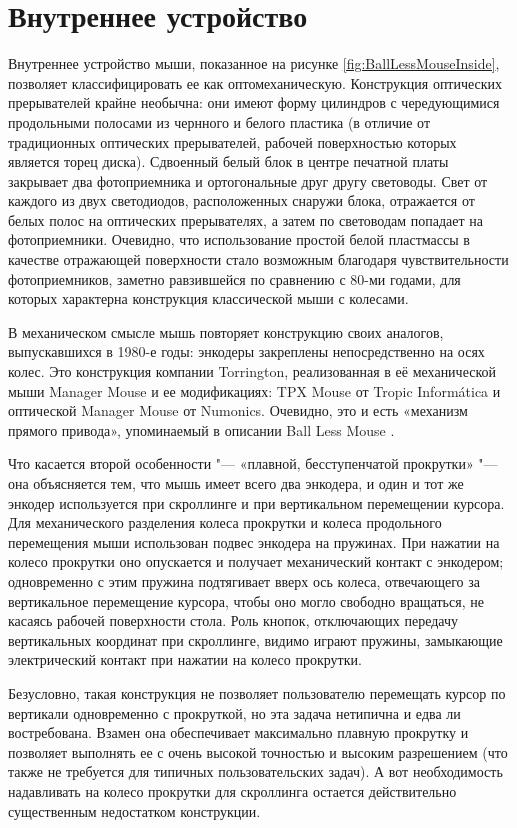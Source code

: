 \documentclass[11pt, a4paper]{article}
\begin{document}
\section*{Внутреннее устройство}

Внутреннее устройство мыши, показанное на рисунке \ref{fig:BallLessMouseInside}, позволяет классифицировать ее как оптомеханическую.
Конструкция оптических прерывателей крайне необычна: они имеют форму цилиндров с чередующимися продольными полосами из чернного и белого пластика (в отличие от традиционных оптических прерывателей, рабочей поверхностью которых является торец диска). 
Сдвоенный белый блок в центре печатной платы закрывает два фотоприемника и ортогональные друг другу световоды. Свет от каждого из двух светодиодов, расположенных снаружи блока, отражается от белых полос на оптических прерывателях, а затем по световодам попадает на фотоприемники. Очевидно, что использование простой белой пластмассы в качестве отражающей поверхности стало возможным благодаря чувствительности фотоприемников, заметно равзившейся по сравнению с 80-ми годами, для которых характерна конструкция классической мыши с колесами.

В механическом смысле мышь повторяет конструкцию своих аналогов, выпускавшихся в 1980-е годы: энкодеры закреплены непосредственно на осях колес. Это конструкция компании Torrington, реализованная в её механической мыши Manager Mouse и ее модификациях: TPX Mouse от Tropic Informática и оптической Manager Mouse от Numonics. Очевидно, это и есть «механизм прямого привода», упоминаемый в описании Ball Less Mouse \cite{details}.

Что касается второй особенности "--- «плавной, бесступенчатой прокрутки» "--- она объясняется тем, что мышь имеет всего два энкодера, и один и тот же энкодер используется при скроллинге и при вертикальном перемещении курсора. Для механического разделения колеса прокрутки и колеса продольного перемещения мыши использован подвес энкодера на пружинах. При нажатии на колесо прокрутки оно опускается и получает механический контакт с энкодером; одновременно с этим пружина подтягивает вверх ось колеса, отвечающего за вертикальное перемещение курсора, чтобы оно могло свободно вращаться, не касаясь рабочей поверхности стола. Роль кнопок, отключающих передачу вертикальных координат при скроллинге, видимо играют пружины, замыкающие электрический контакт при нажатии на колесо прокрутки.

Безусловно, такая конструкция не позволяет пользователю перемещать курсор по вертикали одновременно с прокруткой, но эта задача нетипична и едва ли востребована. Взамен она обеспечивает максимально плавную прокрутку и позволяет выполнять ее с очень высокой точностью и высоким разрешением (что также не требуется для типичных пользовательских задач). А вот необходимость надавливать на колесо прокрутки для скроллинга остается действительно существенным недостатком конструкции.
\end{document}
